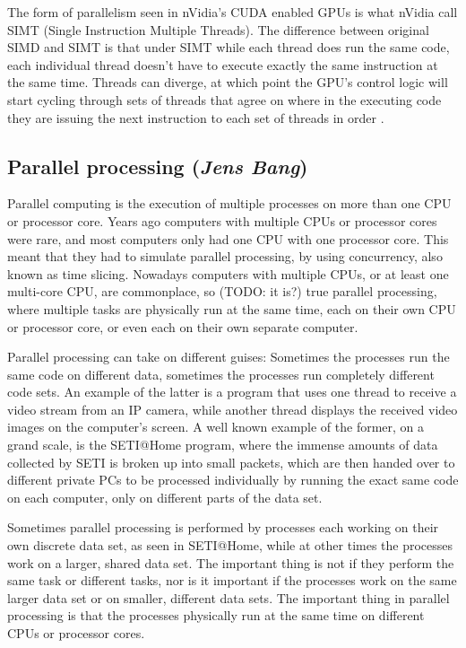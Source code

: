 The form of parallelism seen in nVidia's CUDA enabled GPUs is what nVidia call SIMT (Single Instruction Multiple Threads). The difference between original SIMD and SIMT is that under SIMT while each thread does run the same code, each individual thread doesn't have to execute exactly the same instruction at the same time. Threads can diverge, at which point the GPU's control logic will start cycling through sets of threads that agree on where in the executing code they are issuing the next instruction to each set of threads in order \cite[p.~81-82]{programmingguide}. 

\subsection{Parallel processing (\textit{Jens Bang})}

Parallel computing is the execution of multiple processes on more than one CPU or processor core. Years ago computers with multiple CPUs or processor cores were rare, and most computers only had one CPU with one processor core. This meant that they had to simulate parallel processing, by using concurrency, also known as time slicing. Nowadays computers with multiple CPUs, or at least one multi-core CPU, are commonplace, so (TODO: it is?) true parallel processing, where multiple tasks are physically run at the same time, each on their own CPU or processor core, or even each on their own separate computer.

Parallel processing can take on different guises: Sometimes the processes run the same code on different data, sometimes the processes run completely different code sets. An example of the latter is a program that uses one thread to receive a video stream from an IP camera, while another thread displays the received video images on the computer's screen. A well known example of the former, on a grand scale, is the SETI@Home program, where the immense amounts of data collected by SETI is broken up into small packets, which are then handed over to different private PCs to be processed individually by running the exact same code on each computer, only on different parts of the data set.

Sometimes parallel processing is performed by processes each working on their own discrete data set, as seen in SETI@Home, while at other times the processes work on a larger, shared data set. The important thing is not if they perform the same task or different tasks, nor is it important if the processes work on the same larger data set or on smaller, different data sets. The important thing in parallel processing is that the processes physically run at the same time on different CPUs or processor cores.

